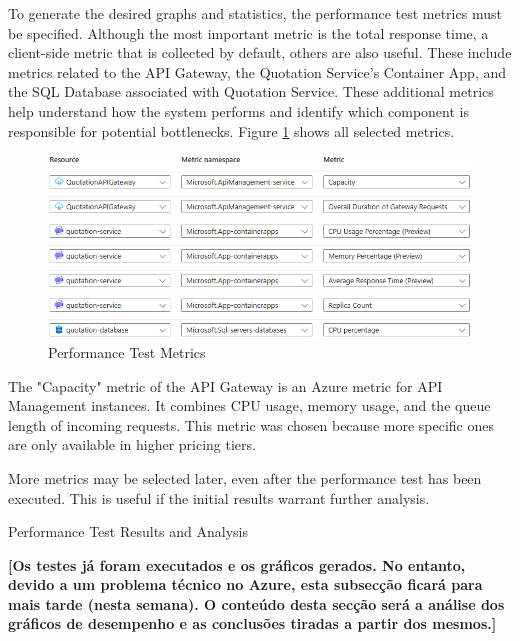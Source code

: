 \documentclass[12pt, reqno, oneside]{amsbook}
\makeatletter
\def\subsection{\@startsection{subsection}{2}%
      \z@{.5\linespacing\@plus.7\linespacing}{.25\linespacing}%
      {\normalfont\bfseries\flushleft}}
\theoremstyle{definition}
\theoremstyle{definition}
\numberwithin{section}{chapter}
\numberwithin{table}{chapter}
\numberwithin{figure}{chapter}
\makeatother
\begin{document}
To generate the desired graphs and statistics, the performance test metrics must be specified. Although the most important metric is the total response time, a client-side metric that is collected by default, others are also useful. These include metrics related to the \ac{API} Gateway, the Quotation Service's Container App, and the SQL Database associated with Quotation Service. These additional metrics help understand how the system performs and identify which component is responsible for potential bottlenecks. Figure \ref{Figure:LoadTestingMetrics} shows all selected metrics.

\begin{figure}[H]
  \centering
  \includegraphics[width=1\linewidth]{images/LoadTestingMetrics.png}
  \caption{\label{Figure:LoadTestingMetrics}Performance Test Metrics}
\end{figure}

The "Capacity" metric of the API Gateway is an Azure metric for API Management instances. It combines \ac{CPU} usage, memory usage, and the queue length of incoming requests. This metric was chosen because more specific ones are only available in higher pricing tiers.

More metrics may be selected later, even after the performance test has been executed. This is useful if the initial results warrant further analysis.

\subsection{Performance Test Results and Analysis}
\label{Subsection:Performance_Test_Results_and_Analysis}

\textbf{[Os testes já foram executados e os gráficos gerados. No entanto, devido a um problema técnico no Azure, esta subsecção ficará para mais tarde (nesta semana). O conteúdo desta secção será a análise dos gráficos de desempenho e as conclusões tiradas a partir dos mesmos.]}
\end{document}
